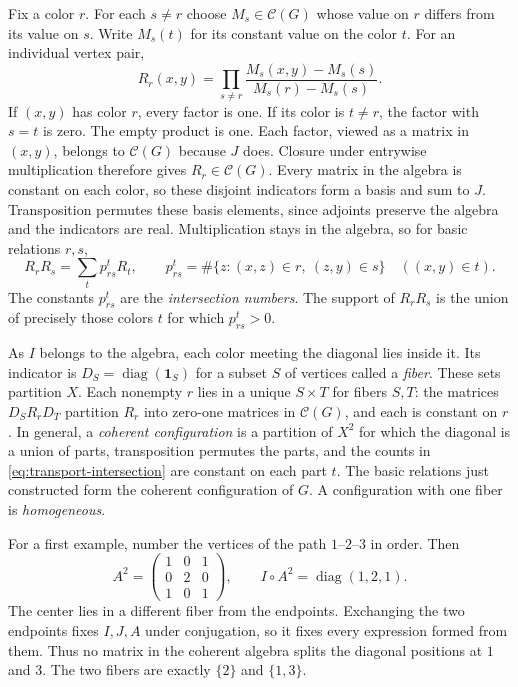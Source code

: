 \documentclass[11pt,reqno]{amsart}
\numberwithin{equation}{section}
\theoremstyle{definition}
\begin{document}
Fix a color $r$. For each $s\ne r$ choose $M_s\in\mathcal C(G)$ whose value on $r$ differs from its value on $s$. Write $M_s(t)$ for its constant value on the color $t$. For an individual vertex pair,
\begin{equation}\label{eq:color-indicator}
 R_r(x,y)=\prod_{s\ne r}
          \frac{M_s(x,y)-M_s(s)}{M_s(r)-M_s(s)} .
\end{equation}
If $(x,y)$ has color $r$, every factor is one. If its color is $t\ne r$, the factor with $s=t$ is zero. The empty product is one. Each factor, viewed as a matrix in $(x,y)$, belongs to $\mathcal C(G)$ because $J$ does. Closure under entrywise multiplication therefore gives $R_r\in\mathcal C(G)$. Every matrix in the algebra is constant on each color, so these disjoint indicators form a basis and sum to $J$.
Transposition permutes these
basis elements, since adjoints preserve the algebra and the indicators are real.
Multiplication stays in the algebra, so for basic relations $r,s$,
\begin{equation}\label{eq:transport-intersection}
 R_rR_s=\sum_t p_{rs}^tR_t,\qquad
 p_{rs}^t=\#\{z:(x,z)\in r,\ (z,y)\in s\}\quad ((x,y)\in t).
\end{equation}
The constants $p_{rs}^t$ are the \emph{intersection numbers}. The support of $R_rR_s$ is the union of precisely those colors $t$ for which $p_{rs}^t>0$.

As $I$ belongs to the algebra, each color meeting the diagonal lies inside it.
Its indicator is $D_S=\operatorname{diag}(\mathbf{1}_S)$ for a subset $S$ of
vertices called a \emph{fiber}. These sets partition $X$.
Each nonempty $r$ lies in a unique $S\times T$ for fibers $S,T$:
the matrices $D_SR_rD_T$ partition $R_r$ into zero-one matrices in
$\mathcal C(G)$, and each is constant on $r$. In general, a \emph{coherent configuration} is a partition of $X^2$ for which the diagonal is a union of parts, transposition permutes the parts, and the counts in \eqref{eq:transport-intersection} are constant on each part $t$. The basic relations just constructed form the coherent configuration of $G$. A configuration with one fiber is \emph{homogeneous}.

For a first example, number the vertices of the path $1$--$2$--$3$ in order. Then
\[
 A^2=\begin{pmatrix}1&0&1\\0&2&0\\1&0&1\end{pmatrix},
 \qquad I\circ A^2=\operatorname{diag}(1,2,1).
\]
The center lies in a different fiber from the endpoints. Exchanging the two endpoints fixes $I,J,A$ under conjugation, so it fixes every expression formed from them. Thus no matrix in the coherent algebra splits the diagonal positions at $1$ and $3$. The two fibers are exactly $\{2\}$ and $\{1,3\}$.
\end{document}
